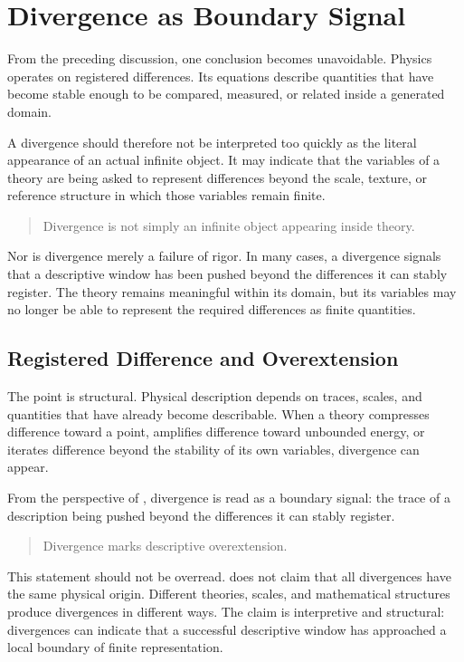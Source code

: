 \section{Divergence as Boundary Signal}

\label{sec:divergence}

From the preceding discussion,
one conclusion becomes unavoidable.
Physics operates on registered differences.
Its equations describe quantities that have become stable enough to be
compared,
measured,
or related inside a generated domain.

A divergence should therefore not be interpreted too quickly as the
literal appearance of an actual infinite object.
It may indicate that the variables of a theory are being asked to
represent differences beyond the scale,
texture,
or reference structure in which those variables remain finite.

\medskip
\begin{quote}
Divergence is not simply an infinite object appearing inside theory.
\end{quote}
\medskip

Nor is divergence merely a failure of rigor.
In many cases,
a divergence signals that a descriptive window has been pushed beyond
the differences it can stably register.
The theory remains meaningful within its domain,
but its variables may no longer be able to represent the required
differences as finite quantities.

\subsection*{Registered Difference and Overextension}

The point is structural.
Physical description depends on traces,
scales,
and quantities that have already become describable.
When a theory compresses difference toward a point,
amplifies difference toward unbounded energy,
or iterates difference beyond the stability of its own variables,
divergence can appear.

From the perspective of \VED{},
divergence is read as a boundary signal:
the trace of a description being pushed beyond the differences it can
stably register.

\medskip
\begin{quote}
Divergence marks descriptive overextension.
\end{quote}
\medskip

This statement should not be overread.
\VED{} does not claim that all divergences have the same physical
origin.
Different theories,
scales,
and mathematical structures produce divergences in different ways.
The claim is interpretive and structural:
divergences can indicate that a successful descriptive window has
approached a local boundary of finite representation.

